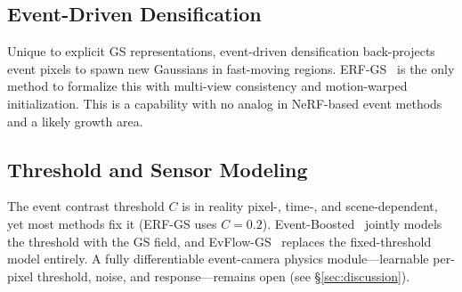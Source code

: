 \subsection{Event-Driven Densification}
\label{sec:cross:densify}

Unique to explicit GS representations, event-driven densification back-projects event pixels to spawn new Gaussians in fast-moving regions. ERF-GS~\cite{bai2026erfgs} is the only method to formalize this with multi-view consistency and motion-warped initialization. This is a capability with no analog in NeRF-based event methods and a likely growth area.

\subsection{Threshold and Sensor Modeling}
\label{sec:cross:threshold}

The event contrast threshold $C$ is in reality pixel-, time-, and scene-dependent, yet most methods fix it (ERF-GS uses $C=0.2$). Event-Boosted~\cite{xu2025eventboosted} jointly models the threshold with the GS field, and EvFlow-GS~\cite{an2026evflow} replaces the fixed-threshold model entirely. A fully differentiable event-camera physics module---learnable per-pixel threshold, noise, and response---remains open (see \S\ref{sec:discussion}).
